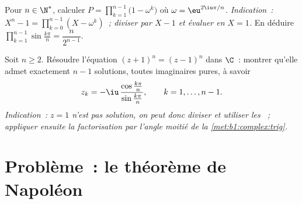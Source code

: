 \begin{exercise}[$\star\star\star$]\label{exo:b1:complex:11}
Pour $n \in \N^*$, calculer $P = \prod_{k=1}^{n-1}
\bigl(1 - \omega^k\bigr)$ où $\omega = \eu^{2\iu\pi/n}$.
\emph{Indication~: $X^n - 1 = \prod_{k=0}^{n-1} (X - \omega^k)$~;
diviser par $X - 1$ et évaluer en $X = 1$.} En déduire
$\prod_{k=1}^{n-1} \sin\frac{k\pi}{n} = \dfrac{n}{2^{n-1}}$.
\end{exercise}

\begin{exercise}[$\star\star$]\label{exo:b1:complex:12}
Soit $n \geq 2$. Résoudre l'équation $(z + 1)^n = (z - 1)^n$ dans
$\C$~: montrer qu'elle admet exactement $n - 1$ solutions, toutes
imaginaires pures, à savoir
\[
z_k = -\iu\,\frac{\cos\frac{k\pi}{n}}{\sin\frac{k\pi}{n}},
\qquad k = 1, \dots, n - 1 .
\]
\emph{Indication~: $z = 1$ n'est pas solution, on peut donc diviser et
utiliser les ~; appliquer ensuite la factorisation
par l'angle moitié de la \cref{met:b1:complex:trig}.}
\end{exercise}

\section{Problème~: le théorème de Napoléon}

